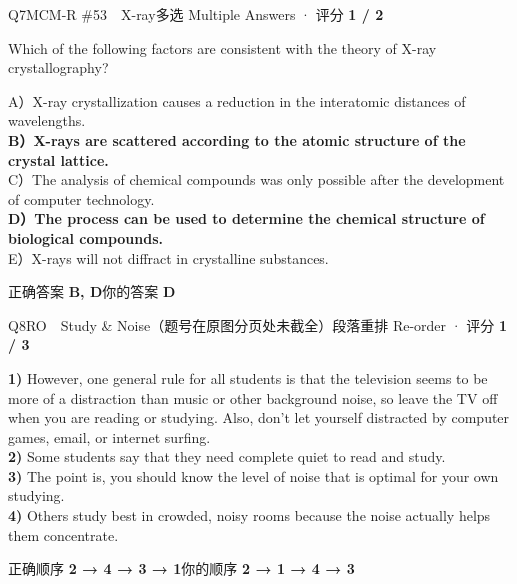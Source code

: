 \begin{qblock}{Q7\quad MCM-R \#53\ \ X-ray}{多选 Multiple Answers · 评分 \textcolor{cAccent}{\bfseries 1 / 2}}
\begin{notebox}\small Which of the following factors are consistent with the theory of X-ray crystallography?\end{notebox}
{\small
A）X-ray crystallization causes a reduction in the interatomic distances of wavelengths.\\
{\color{cFix}\textbf{B）X-rays are scattered according to the atomic structure of the crystal lattice.}}\\
C）The analysis of chemical compounds was only possible after the development of computer technology.\\
{\color{cFix}\textbf{D）The process can be used to determine the chemical structure of biological compounds.}}\\
E）X-rays will not diffract in crystalline substances.}
\smallskip\par
{\small 正确答案 \textcolor{cFix}{\bfseries B, D}\qquad 你的答案 {\color{cWrong}\bfseries D}}
\end{qblock}

\begin{qblock}{Q8\quad RO\ \ Study \& Noise（题号在原图分页处未截全）}{段落重排 Re-order · 评分 \textcolor{cAccent}{\bfseries 1 / 3}}
\begin{promptbox}\small
\textbf{1)} However, one general rule for all students is that the television seems to be more of a distraction than music or other background noise, so leave the TV off when you are reading or studying. Also, don't let yourself distracted by computer games, email, or internet surfing.\\[2pt]
\textbf{2)} Some students say that they need complete quiet to read and study.\\[2pt]
\textbf{3)} The point is, you should know the level of noise that is optimal for your own studying.\\[2pt]
\textbf{4)} Others study best in crowded, noisy rooms because the noise actually helps them concentrate.
\end{promptbox}
\smallskip\par
{\small 正确顺序 \textcolor{cFix}{\bfseries 2 → 4 → 3 → 1}\qquad 你的顺序 {\color{cWrong}\bfseries 2 → 1 → 4 → 3}}
\end{qblock}

